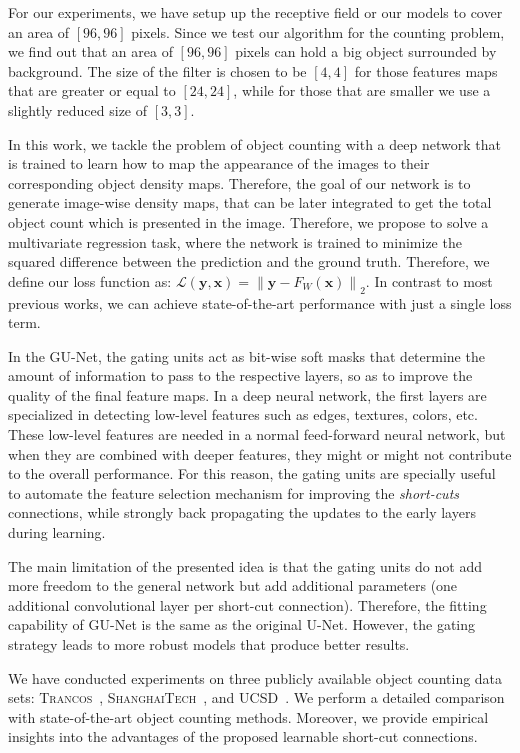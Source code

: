 \documentclass{bmvc2k}
\begin{document}
For our experiments, we have setup up the receptive field or our models to cover an area of $[96,96]$ pixels. Since we test our algorithm for the counting problem, we find out that an area of $[96,96]$ pixels can hold a big object surrounded by background. The size of the filter is chosen to be $[4,4]$ for those features maps that are greater or equal to $[24,24]$, while for those that are smaller we use a slightly reduced size of $[3,3]$. 

In this work, we tackle the problem of object counting with a deep network that is trained to learn how to map the appearance of the images to their corresponding object density maps. Therefore, the goal of our network is to generate image-wise density maps, that can be later integrated to get the total object count which is presented in the image. Therefore, we propose to solve a multivariate regression task, where the network is trained to minimize the squared difference between the prediction and the ground truth. Therefore, we define our loss function as: $\mathcal{L}(\boldsymbol{y}, \boldsymbol{x}) = \left \| \boldsymbol{y} - F_W(\boldsymbol{x}) \right \|_2$. In contrast to most previous works, we can achieve state-of-the-art performance with just a single loss term.

In the GU-Net, the gating units act as bit-wise soft masks that determine the amount of information to pass to the respective layers, so as to improve the quality of the final feature maps. In a deep neural network, the first layers are specialized in detecting low-level features such as edges, textures, colors, etc. These low-level features are needed in a normal feed-forward neural network, but when they are combined with deeper features, they might or might not contribute to the overall performance. For this reason, the gating units are specially useful to automate the feature selection mechanism for improving the \emph{short-cuts} connections, while strongly back propagating the updates to the early layers during learning.

The main limitation of the presented idea is that the gating units do not add more freedom to the general network but add additional parameters (one additional convolutional layer per short-cut connection). Therefore, the fitting capability of GU-Net is the same as the original U-Net. However, the gating strategy leads to more robust models that produce better results.

We have conducted experiments on three publicly available object counting data sets: \textsc{Trancos}~\cite{guerrero2015}, \textsc{ShanghaiTech}~\cite{zhang2016}, and \textsc{UCSD}~\cite{chan2008}. We perform a detailed comparison with state-of-the-art object counting methods. Moreover, we provide empirical insights into the advantages of the proposed learnable short-cut connections.
\end{document}

